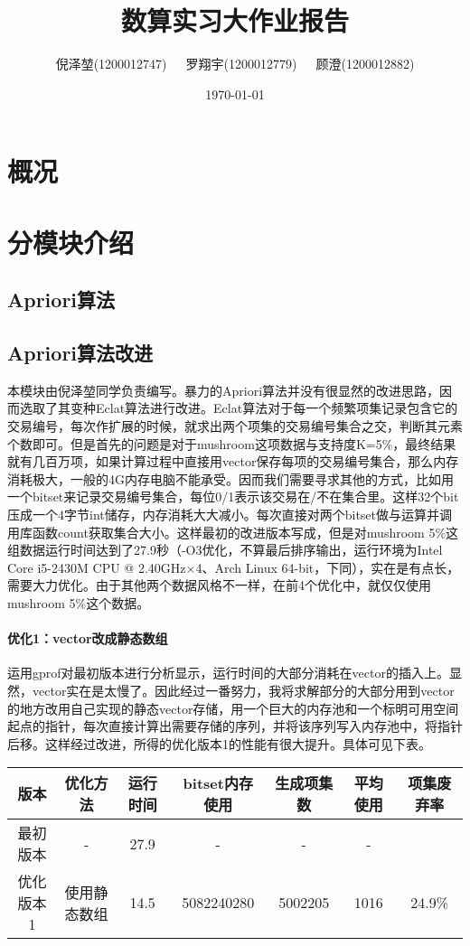 \documentclass[a4paper,9pt]{article}
\title{\textbf{数算实习大作业报告}}
\author{\small{倪泽堃(1200012747)\ \ \ 罗翔宇(1200012779)\ \ \ 顾澄(1200012882)}}
\date{\today}
\begin{document}
\maketitle
\section{概况}

\section{分模块介绍}

\subsection{Apriori算法}

\subsection{Apriori算法改进}
本模块由倪泽堃同学负责编写。暴力的Apriori算法并没有很显然的改进思路，因而选取了其变种Eclat算法进行改进。Eclat算法对于每一个频繁项集记录包含它的交易编号，每次作扩展的时候，就求出两个项集的交易编号集合之交，判断其元素个数即可。但是首先的问题是对于mushroom这项数据与支持度K=5\%，最终结果就有几百万项，如果计算过程中直接用vector保存每项的交易编号集合，那么内存消耗极大，一般的4G内存电脑不能承受。因而我们需要寻求其他的方式，比如用一个bitset来记录交易编号集合，每位0/1表示该交易在/不在集合里。这样32个bit压成一个4字节int储存，内存消耗大大减小。每次直接对两个bitset做与运算并调用库函数count获取集合大小。这样最初的改进版本写成，但是对mushroom 5\%这组数据运行时间达到了27.9秒（-O3优化，不算最后排序输出，运行环境为Intel Core i5-2430M CPU @ 2.40GHz$\times$4、Arch Linux 64-bit，下同），实在是有点长，需要大力优化。由于其他两个数据风格不一样，在前4个优化中，就仅仅使用mushroom 5\%这个数据。

\paragraph{优化1：vector改成静态数组}
运用gprof对最初版本进行分析显示，运行时间的大部分消耗在vector的插入上。显然，vector实在是太慢了。因此经过一番努力，我将求解部分的大部分用到vector的地方改用自己实现的静态vector存储，用一个巨大的内存池和一个标明可用空间起点的指针，每次直接计算出需要存储的序列，并将该序列写入内存池中，将指针后移。这样经过改进，所得的优化版本1的性能有很大提升。具体可见下表。
\begin{center}
	\begin{tabular}{ccccccc}
		版本&优化方法&运行时间&bitset内存使用&生成项集数&平均使用&项集废弃率\\\hline
		最初版本&-&27.9&-&-&-\\
		优化版本1&使用静态数组&14.5&5082240280&5002205&1016&24.9\%
	\end{tabular}
\end{center}
\end{document}
